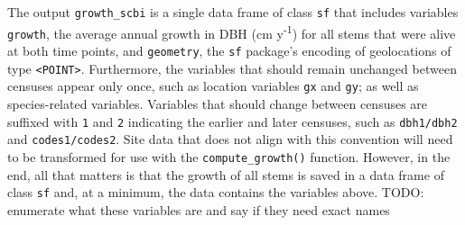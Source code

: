 \documentclass[12pt]{article}
\newenvironment{Shaded}{\begin{snugshade}}{\end{snugshade}}
\newcommand{\CommentTok}[1]{\textcolor[rgb]{0.56,0.35,0.01}{\textit{#1}}}
\newcommand{\DataTypeTok}[1]{\textcolor[rgb]{0.13,0.29,0.53}{#1}}
\newcommand{\DecValTok}[1]{\textcolor[rgb]{0.00,0.00,0.81}{#1}}
\newcommand{\KeywordTok}[1]{\textcolor[rgb]{0.13,0.29,0.53}{\textbf{#1}}}
\newcommand{\NormalTok}[1]{#1}
\newcommand{\OperatorTok}[1]{\textcolor[rgb]{0.81,0.36,0.00}{\textbf{#1}}}
\newcommand{\StringTok}[1]{\textcolor[rgb]{0.31,0.60,0.02}{#1}}
\begin{document}
\begin{Shaded}
\end{Shaded}

The output \texttt{growth\_scbi} is a single data frame of class
\texttt{sf} that includes variables \texttt{growth}, the average annual
growth in DBH (cm y\textsuperscript{-1}) for all stems that were alive
at both time points, and \texttt{geometry}, the \texttt{sf} package's
encoding of geolocations of type
\texttt{\textless{}POINT\textgreater{}}. Furthermore, the variables that
should remain unchanged between censuses appear only once, such as
location variables \texttt{gx} and \texttt{gy}; as well as
species-related variables. Variables that should change between censuses
are suffixed with \texttt{1} and \texttt{2} indicating the earlier and
later censuses, such as \texttt{dbh1/dbh2} and \texttt{codes1/codes2}.
Site data that does not align with this convention will need to be
transformed for use with the \texttt{compute\_growth()} function.
However, in the end, all that matters is that the growth of all stems is
saved in a data frame of class \texttt{sf} and, at a minimum, the data
contains the variables above. TODO: enumerate what these variables are
and say if they need exact names
\end{document}
